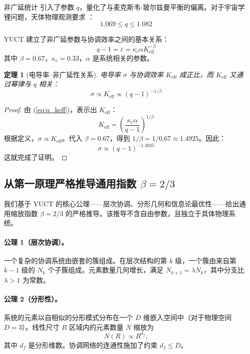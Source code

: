 \documentclass[12pt,a4paper]{article}
\newtheorem{theorem}{定理}[section]
\theoremstyle{remark}
\newcommand{\Ke}{K_{\mathrm{eff}}}
\newcommand{\kappac}{\kappa_c}
\newcommand{\alp}{\alpha}
\begin{document}
	非广延统计 \cite{tsallis1988} 引入了参数 \(q\)，量化了与麦克斯韦-玻尔兹曼平衡的偏离。对于宇宙学锂问题，天体物理观测要求 \cite{bertulani2015}：
	\begin{equation}
		1.069 \le q \le 1.082
		\label{eq:q_range}
	\end{equation}
	
	YUCT 建立了非广延参数与协调效率之间的基本关系：
	\begin{equation}
		q - 1 = \varepsilon = \kappac \alp \Ke^{-\beta}
		\label{eq:q_keff}
	\end{equation}
	其中 \(\beta = 0.67\)，\(\kappac = 0.33\)，\(\alp\) 是系统相关的参数。
	
	\begin{theorem}[电导率–非广延性关系]
		电导率 \(\sigma\) 与协调效率 \(\Ke\) 成正比，而 \(\Ke\) 又通过幂律与 \(q\) 相关：
		\begin{equation}
			\sigma \propto \Ke \propto (q-1)^{-1/\beta}
			\label{eq:sigma_q}
		\end{equation}
		\label{th:conductivity}
	\end{theorem}
	
	\begin{proof}
		由 (\ref{eq:q_keff})，表示出 \(\Ke\)：
		\[
		\Ke = \left( \frac{\kappac \alp}{q-1} \right)^{1/\beta}
		\]
		根据定义，\(\sigma \propto \Ke\)。代入 \(\beta = 0.67\)，得到 \(1/\beta = 1/0.67 \approx 1.4925\)。因此：
		\[
		\sigma \propto (q-1)^{-1.4925}
		\]
		这就完成了证明。
	\end{proof}
	
	\subsection{从第一原理严格推导通用指数 \(\beta = 2/3\)}
	\label{subsec:beta_derivation}
	
	我们基于 YUCT 的核心公理——层次协调、分形几何和信息论最优性——给出通用缩放指数 \(\beta = 2/3\) 的严格推导。该推导不含自由参数，且独立于具体物理系统。
	
	\paragraph{公理 1（层次协调）。}
	一个复杂的协调系统由嵌套的簇组成。在层次结构的第 \(k\) 级，一个簇由来自第 \(k-1\) 级的 \(N_k\) 个子簇组成。元素数量几何增长，满足 \(N_{k+1} = \lambda N_k\)，其中分支比 \(\lambda > 1\) 为常数。
	
	\paragraph{公理 2（分形性）。}
	系统的元素以自相似的分形模式分布在一个 \(D\) 维嵌入空间中（对于物理空间 \(D = 3\)）。线性尺寸 \(R\) 区域内的元素数量 \(N\) 缩放为
	\begin{equation}
		N(R) \propto R^{d_f},
		\label{eq:fractal_dim}
	\end{equation}
	其中 \(d_f\) 是分形维数。协调网络的连通性施加了约束 \(d_f \le D\)。
	
\end{document}
